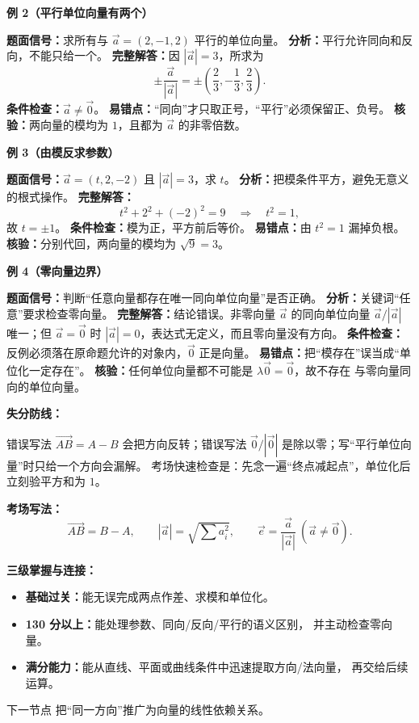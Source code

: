 \begin{knowledgeBox}
\textbf{例 2（平行单位向量有两个）}

\textbf{题面信号：}求所有与 \(\vec a=(2,-1,2)\) 平行的单位向量。
\textbf{分析：}平行允许同向和反向，不能只给一个。
\textbf{完整解答：}因 \(|\vec a|=3\)，所求为
\[
\pm\frac{\vec a}{|\vec a|}
=\pm\left(\frac23,-\frac13,\frac23\right).
\]
\textbf{条件检查：}\(\vec a\ne\vec0\)。
\textbf{易错点：}“同向”才只取正号，“平行”必须保留正、负号。
\textbf{核验：}两向量的模均为 \(1\)，且都为 \(\vec a\) 的非零倍数。

\textbf{例 3（由模反求参数）}

\textbf{题面信号：}\(\vec a=(t,2,-2)\) 且 \(|\vec a|=3\)，求 \(t\)。
\textbf{分析：}把模条件平方，避免无意义的根式操作。
\textbf{完整解答：}
\[
t^2+2^2+(-2)^2=9\quad\Longrightarrow\quad t^2=1,
\]
故 \(t=\pm1\)。
\textbf{条件检查：}模为正，平方前后等价。
\textbf{易错点：}由 \(t^2=1\) 漏掉负根。
\textbf{核验：}分别代回，两向量的模均为 \(\sqrt9=3\)。

\textbf{例 4（零向量边界）}

\textbf{题面信号：}判断“任意向量都存在唯一同向单位向量”是否正确。
\textbf{分析：}关键词“任意”要求检查零向量。
\textbf{完整解答：}结论错误。非零向量 \(\vec a\) 的同向单位向量
\(\vec a/|\vec a|\) 唯一；但 \(\vec a=\vec0\) 时
\(|\vec a|=0\)，表达式无定义，而且零向量没有方向。
\textbf{条件检查：}反例必须落在原命题允许的对象内，\(\vec0\) 正是向量。
\textbf{易错点：}把“模存在”误当成“单位化一定存在”。
\textbf{核验：}任何单位向量都不可能是 \(\lambda\vec0=\vec0\)，故不存在
与零向量同向的单位向量。

\textbf{失分防线：}

错误写法 \(\overrightarrow{AB}=A-B\) 会把方向反转；错误写法
\(\vec0/|\vec0|\) 是除以零；写“平行单位向量”时只给一个方向会漏解。
考场快速检查是：先念一遍“终点减起点”，单位化后立刻验平方和为 \(1\)。

\textbf{考场写法：}
\[
\boxed{\overrightarrow{AB}=B-A,\qquad
|\vec a|=\sqrt{\sum a_i^2},\qquad
\vec e=\frac{\vec a}{|\vec a|}\ (\vec a\ne\vec0).}
\]

\textbf{三级掌握与连接：}

\begin{itemize}
  \item \textbf{基础过关：}能无误完成两点作差、求模和单位化。
  \item \textbf{130 分以上：}能处理参数、同向/反向/平行的语义区别，
  并主动检查零向量。
  \item \textbf{满分能力：}能从直线、平面或曲线条件中迅速提取方向/法向量，
  再交给后续运算。
\end{itemize}
下一节点 
把“同一方向”推广为向量的线性依赖关系。
\end{knowledgeBox}


